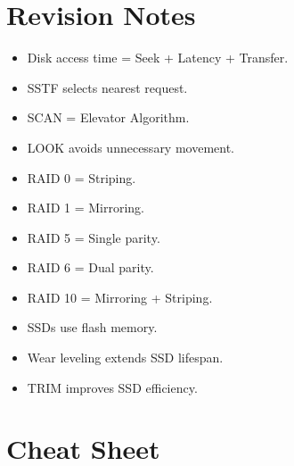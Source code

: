 \section{Revision Notes}

\begin{itemize}
\item Disk access time = Seek + Latency + Transfer.
\item SSTF selects nearest request.
\item SCAN = Elevator Algorithm.
\item LOOK avoids unnecessary movement.
\item RAID 0 = Striping.
\item RAID 1 = Mirroring.
\item RAID 5 = Single parity.
\item RAID 6 = Dual parity.
\item RAID 10 = Mirroring + Striping.
\item SSDs use flash memory.
\item Wear leveling extends SSD lifespan.
\item TRIM improves SSD efficiency.
\end{itemize}

\section{Cheat Sheet}

